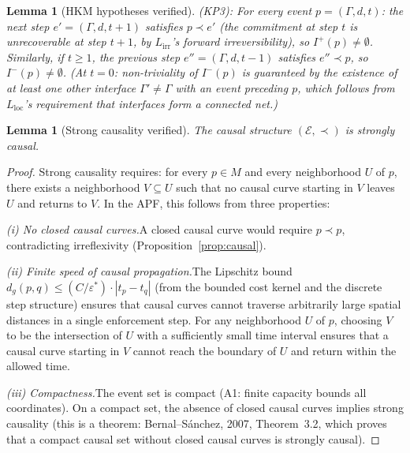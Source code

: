 \documentclass[11pt,a4paper]{article}
\newtheorem{lemma}[theorem]{Lemma}
\theoremstyle{definition}
\newcommand{\eps}{\varepsilon}
\begin{document}
\begin{lemma}[HKM hypotheses verified]
(KP3): For every event $p = (\Gamma, d, t)$: the next step
$e' = (\Gamma, d, t+1)$ satisfies $p \prec e'$ (the commitment at
step $t$ is unrecoverable at step $t+1$, by $L_{\mathrm{irr}}$'s
forward irreversibility), so $I^+(p) \ne \emptyset$.  Similarly, if
$t \ge 1$, the previous step $e'' = (\Gamma, d, t-1)$ satisfies
$e'' \prec p$, so $I^-(p) \ne \emptyset$.  (At $t = 0$:
non-triviality of $I^-(p)$ is guaranteed by the existence of at least
one other interface $\Gamma' \ne \Gamma$ with an event preceding $p$,
which follows from $L_{\mathrm{loc}}$'s requirement that interfaces
form a connected net.)
\end{lemma}

\begin{lemma}[Strong causality verified]\label{lem:strong_causal}
The causal structure $(\mathcal{E}, \prec)$ is strongly causal.
\end{lemma}

\begin{proof}
Strong causality requires: for every $p \in M$ and every neighborhood
$U$ of $p$, there exists a neighborhood $V \subseteq U$ such that no
causal curve starting in $V$ leaves $U$ and returns to $V$.  In the
APF, this follows from three properties:

\textit{(i) No closed causal curves.}\quad A closed causal curve would
require $p \prec p$, contradicting irreflexivity
(Proposition~\ref{prop:causal}).

\textit{(ii) Finite speed of causal propagation.}\quad The Lipschitz
bound $d_g(p, q) \le (C/\eps^*) \cdot |t_p - t_q|$ (from the
bounded cost kernel and the discrete step structure) ensures that
causal curves cannot traverse arbitrarily large spatial distances in
a single enforcement step.  For any neighborhood $U$ of $p$, choosing
$V$ to be the intersection of $U$ with a sufficiently small time
interval ensures that a causal curve starting in $V$ cannot reach the
boundary of $U$ and return within the allowed time.

\textit{(iii) Compactness.}\quad The event set is compact (A1: finite
capacity bounds all coordinates).  On a compact set, the absence of
closed causal curves implies strong causality (this is a theorem:
Bernal--S\'{a}nchez, 2007, Theorem~3.2, which proves that a
compact causal set without closed causal curves is strongly causal).
\end{proof}
\end{document}
